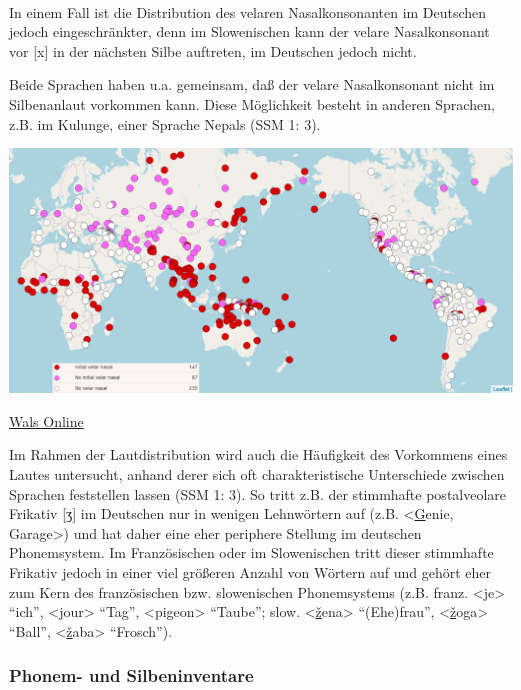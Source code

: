 \documentclass[
]{article}
\begin{document}
~

In einem Fall ist die Distribution des velaren Nasalkonsonanten im
Deutschen jedoch eingeschränkter, denn im Slowenischen kann der velare
Nasalkonsonant vor {[}x{]} in der nächsten Silbe auftreten, im Deutschen
jedoch nicht.

Beide Sprachen haben u.a. gemeinsam, daß der velare Nasalkonsonant nicht
im Silbenanlaut vorkommen kann. Diese Möglichkeit besteht in anderen
Sprachen, z.B. im Kulunge, einer Sprache Nepals (SSM 1: 3).

\includegraphics[width=1\linewidth]{pictures/01b_NSG_Intro_2020-10-07/wals_velar_nasal}

\href{https://wals.info/}{Wals Online}

Im Rahmen der Lautdistribution wird auch die Häufigkeit des Vorkommens
eines Lautes untersucht, anhand derer sich oft charakteristische
Unterschiede zwischen Sprachen feststellen lassen (SSM 1: 3). So tritt
z.B. der stimmhafte postalveolare Frikativ {[}ʒ{]} im Deutschen nur in
wenigen Lehnwörtern auf (z.B. \textless{}\underline{G}enie, Gara\underline{g}e\textgreater) und hat
daher eine eher periphere Stellung im deutschen Phonemsystem. Im
Französischen oder im Slowenischen tritt dieser stimmhafte Frikativ
jedoch in einer viel größeren Anzahl von Wörtern auf und gehört eher zum
Kern des französischen bzw. slowenischen Phonemsystems (z.B. franz.
\textless{}\underline{j}e\textgreater{} ``ich'', \textless{}\underline{j}our\textgreater{} ``Tag'', \textless pi\underline{g}eon\textgreater{} ``Taube'';
slow. \textless{}\underline{ž}ena\textgreater{} ``(Ehe)frau'', \textless{}\underline{ž}oga\textgreater{} ``Ball'',
\textless{}\underline{ž}aba\textgreater{} ``Frosch'').

\hypertarget{phonem--und-silbeninventare}{%
\subsubsection{Phonem- und Silbeninventare}\label{phonem--und-silbeninventare}}
\end{document}
